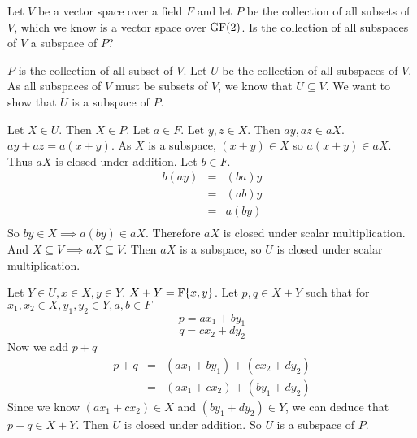 \begin{problem}[Golan 93]

Let $V$ be a vector space over a field $F$ and let $P$ be the collection of all
subsets of $V$, which we know is a vector space over $\operatorname{GF}(2)$.  Is the
collection of all subspaces of $V$ a subspace of $P$?

\end{problem}
\smallskip
\begin{solution}

$P$ is the collection of all subset of $V$. Let $U$ be the collection of all subspaces of $V$. As all subspaces of $V$ must be subsets of $V$, we know that $U \subseteq V$. We want to show that $U$ is a subspace of $P$.

Let $X \in U$. Then $X \in P$. Let $a \in F$. Let $y,z \in X$.  Then $ay, az \in aX$. $ay + az = a(x+y)$.  As $X$ is a subspace, $(x+y) \in X$ so $a(x+y) \in aX$. Thus $aX$ is closed under addition. Let $b \in F$. 
\begin{eqnarray*}
b(ay) & = & (ba)y \\
	  & = & (ab)y \\
	  & = & a(by) \\
\end{eqnarray*}
So $by \in X \implies a(by) \in aX$. Therefore $aX$ is closed under scalar
multiplication. And $X \subseteq V \implies aX \subseteq V$. Then $aX$ is a
subspace, so $U$ is closed under scalar multiplication. 

Let $Y \in U, x \in X, y \in Y$. $X + Y = \mathbb{F}\{x,y\}$. Let $p,q \in X + Y$ such that for $x_1,x_2 \in X, y_1,y_2 \in Y, a,b \in F$
$$p = ax_1 + by_1$$
$$q = cx_2 + dy_2$$
Now we add $p + q$
\begin{eqnarray}
p + q & = &(ax_1 + by_1) + (cx_2 + dy_2) \\
	  & = &(ax_1 + cx_2) + (by_1 + dy_2) 
\end{eqnarray}
Since we know $(ax_1 + cx_2) \in X$ and $(by_1 + dy_2) \in Y$, we can deduce that $p + q \in X + Y$. Then $U$ is closed under addition.  So $U$ is a subspace of $P$.
\end{solution}
\probskip



